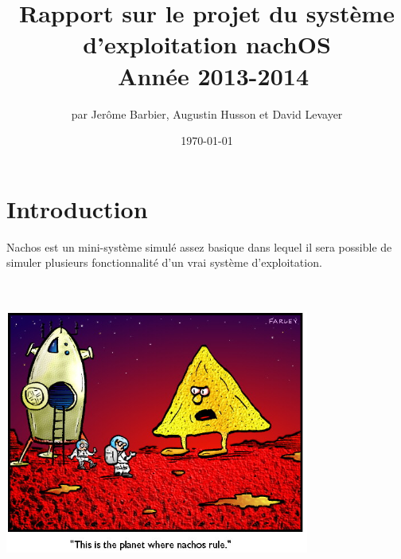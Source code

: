 \documentclass[a4paper,10pt]{report}
\title{Rapport sur le projet du système d'exploitation nachOS\\ Année 2013-2014}
\author{par Jerôme Barbier, Augustin Husson et David Levayer}
\date{\today}
\begin{document}
   \maketitle
  \tableofcontents
  \newpage
  \part{Introduction}
  Nachos est un mini-système simulé assez basique dans lequel il sera possible de simuler plusieurs fonctionnalité d'un vrai système d'exploitation. 
  
      \begin{center}
    \includegraphics[width=10cm,height=10cm]{nachos.png}\\
    \end{center}
\end{document}
